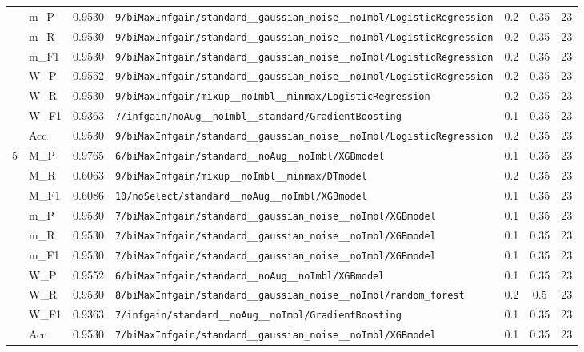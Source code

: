 \begin{table}[htbp]
\begin{tabular}{|c|l|c|>{\ttfamily\footnotesize}p{7.2cm}|c|c|c|}
 & m\_P & 0.9530 & \texttt{9/biMaxInfgain/standard\_\_gaussian\_noise\_\_noImbl/LogisticRegression} & 0.2 & 0.35  & 23 \\ 
 & m\_R & 0.9530 & \texttt{9/biMaxInfgain/standard\_\_gaussian\_noise\_\_noImbl/LogisticRegression} & 0.2 & 0.35  & 23 \\ 
 & m\_F1 & 0.9530 & \texttt{9/biMaxInfgain/standard\_\_gaussian\_noise\_\_noImbl/LogisticRegression} & 0.2 & 0.35  & 23 \\ 
 & W\_P & 0.9552 & \texttt{9/biMaxInfgain/standard\_\_gaussian\_noise\_\_noImbl/LogisticRegression} & 0.2 & 0.35  & 23 \\ 
 & W\_R & 0.9530 & \texttt{9/biMaxInfgain/mixup\_\_noImbl\_\_minmax/LogisticRegression} & 0.2 & 0.35  & 23 \\ 
 & W\_F1 & 0.9363 & \texttt{7/infgain/noAug\_\_noImbl\_\_standard/GradientBoosting} & 0.1 & 0.35  & 23 \\ 
 & Acc & 0.9530 & \texttt{9/biMaxInfgain/standard\_\_gaussian\_noise\_\_noImbl/LogisticRegression} & 0.2 & 0.35  & 23 \\ 
\hline
\multirow{10}{*}{5} & M\_P & 0.9765 & \texttt{6/biMaxInfgain/standard\_\_noAug\_\_noImbl/XGBmodel} & 0.1 & 0.35  & 23 \\ 
 & M\_R & 0.6063 & \texttt{9/biMaxInfgain/mixup\_\_noImbl\_\_minmax/DTmodel} & 0.2 & 0.35  & 23 \\ 
 & M\_F1 & 0.6086 & \texttt{10/noSelect/standard\_\_noAug\_\_noImbl/XGBmodel} & 0.1 & 0.35  & 23 \\ 
 & m\_P & 0.9530 & \texttt{7/biMaxInfgain/standard\_\_gaussian\_noise\_\_noImbl/XGBmodel} & 0.1 & 0.35  & 23 \\ 
 & m\_R & 0.9530 & \texttt{7/biMaxInfgain/standard\_\_gaussian\_noise\_\_noImbl/XGBmodel} & 0.1 & 0.35  & 23 \\ 
 & m\_F1 & 0.9530 & \texttt{7/biMaxInfgain/standard\_\_gaussian\_noise\_\_noImbl/XGBmodel} & 0.1 & 0.35  & 23 \\ 
 & W\_P & 0.9552 & \texttt{6/biMaxInfgain/standard\_\_noAug\_\_noImbl/XGBmodel} & 0.1 & 0.35  & 23 \\ 
 & W\_R & 0.9530 & \texttt{8/biMaxInfgain/standard\_\_gaussian\_noise\_\_noImbl/random\_forest} & 0.2 & 0.5  & 23 \\ 
 & W\_F1 & 0.9363 & \texttt{7/infgain/standard\_\_noAug\_\_noImbl/GradientBoosting} & 0.1 & 0.35  & 23 \\ 
 & Acc & 0.9530 & \texttt{7/biMaxInfgain/standard\_\_gaussian\_noise\_\_noImbl/XGBmodel} & 0.1 & 0.35  & 23 \\ 
\hline
\end{tabular}
\end{table}